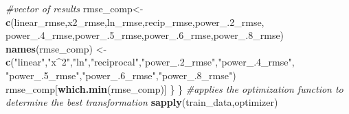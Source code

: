 \documentclass[]{article}
\newenvironment{Shaded}{\begin{snugshade}}{\end{snugshade}}
\newcommand{\CommentTok}[1]{\textcolor[rgb]{0.56,0.35,0.01}{\textit{#1}}}
\newcommand{\DecValTok}[1]{\textcolor[rgb]{0.00,0.00,0.81}{#1}}
\newcommand{\KeywordTok}[1]{\textcolor[rgb]{0.13,0.29,0.53}{\textbf{#1}}}
\newcommand{\NormalTok}[1]{#1}
\newcommand{\StringTok}[1]{\textcolor[rgb]{0.31,0.60,0.02}{#1}}
\begin{document}
\begin{Shaded}
\begin{Highlighting}[]
    \CommentTok{#vector of results}
\NormalTok{    rmse_comp<-}\KeywordTok{c}\NormalTok{(linear_rmse,x2_rmse,ln_rmse,recip_rmse,power_.}\DecValTok{2}\NormalTok{_rmse,}
\NormalTok{                 power_.}\DecValTok{4}\NormalTok{_rmse,power_.}\DecValTok{5}\NormalTok{_rmse,power_.}\DecValTok{6}\NormalTok{_rmse,power_.}\DecValTok{8}\NormalTok{_rmse)}
    \KeywordTok{names}\NormalTok{(rmse_comp) <-}\StringTok{ }\KeywordTok{c}\NormalTok{(}\StringTok{"linear"}\NormalTok{,}\StringTok{"x^2"}\NormalTok{,}\StringTok{"ln"}\NormalTok{,}\StringTok{"reciprocal"}\NormalTok{,}\StringTok{"power_.2_rmse"}\NormalTok{,}\StringTok{"power_.4_rmse"}\NormalTok{,}
                          \StringTok{"power_.5_rmse"}\NormalTok{,}\StringTok{"power_.6_rmse"}\NormalTok{,}\StringTok{"power_.8_rmse"}\NormalTok{)}
\NormalTok{    rmse_comp[}\KeywordTok{which.min}\NormalTok{(rmse_comp)]}
\NormalTok{  \}}
\NormalTok{\}}
\CommentTok{#applies the optimization function to determine the best transformation}
\KeywordTok{sapply}\NormalTok{(train_data,optimizer)}
\end{Highlighting}
\end{Shaded}
\end{document}
